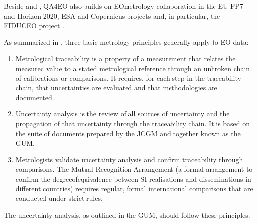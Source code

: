\documentclass[a4paper,10pt,english]{sphinxmanual}
\begin{document}
\sphinxAtStartPar
Beside {\hyperref[\detokenize{04_uncertainty_analysis:ref-jcgmvim}]{}} and {\hyperref[\detokenize{04_uncertainty_analysis:ref-jcgmgum}]{}}, QA4EO also builds on EO\sphinxhyphen{}metrology collaboration in the EU FP7 and Horizon 2020, ESA and Copernicus projects and, in particular, the FIDUCEO project {\hyperref[\detokenize{04_uncertainty_analysis:ref-mittaz19}]{}}.

\sphinxAtStartPar
As summarized in {\hyperref[\detokenize{04_uncertainty_analysis:ref-qa4eo2}]{}}, three basic metrology principles generally apply to EO data:
\begin{enumerate}
%
\item {} 
\sphinxAtStartPar
{} Metrological traceability is a property of a measurement that relates the measured value to a stated metrological reference through an unbroken chain of calibrations or comparisons. It requires, for each step in the traceability chain, that uncertainties are evaluated and that methodologies are documented.

\item {} 
\sphinxAtStartPar
{} Uncertainty analysis is the review of all sources of uncertainty and the propagation of that uncertainty through the traceability chain. It is based on the suite of documents prepared by the JCGM and together known as the GUM.

\item {} 
\sphinxAtStartPar
{} Metrologists validate uncertainty analysis and confirm traceability through comparisons. The Mutual Recognition Arrangement (a formal arrangement to confirm the degree\sphinxhyphen{}of\sphinxhyphen{}equivalence between SI realisations and disseminations in different countries) requires regular, formal international comparisons that are conducted under strict rules.

\end{enumerate}

\sphinxAtStartPar
The uncertainty analysis, as outlined in the GUM, should follow these principles.
\end{document}
